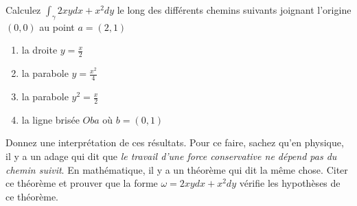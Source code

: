 
\begin{exercice}\label{exoVariete0008}

Calculez $\int_\gamma 2xy dx+x^2dy$ le long des différents chemins suivants joignant l'origine $(0,0)$ au point $a=(2,1)$
\begin{enumerate}
\item la droite $y=\frac{x}{2}$
\item la parabole $y=\frac{x^2}{4}$
\item la parabole $y^2=\frac{x}{2}$
\item la ligne brisée $Oba$ où $b=(0,1)$
\end{enumerate}
Donnez une interprétation de ces résultats. Pour ce faire, sachez qu'en physique, il y a un adage qui dit que \emph{le travail d'une force conservative ne dépend pas du chemin suivit}. En mathématique, il y a un théorème qui dit la même chose. Citer ce théorème et prouver que la forme $\omega=2xydx+x^2dy$ vérifie les hypothèses de ce théorème.

\end{exercice}

